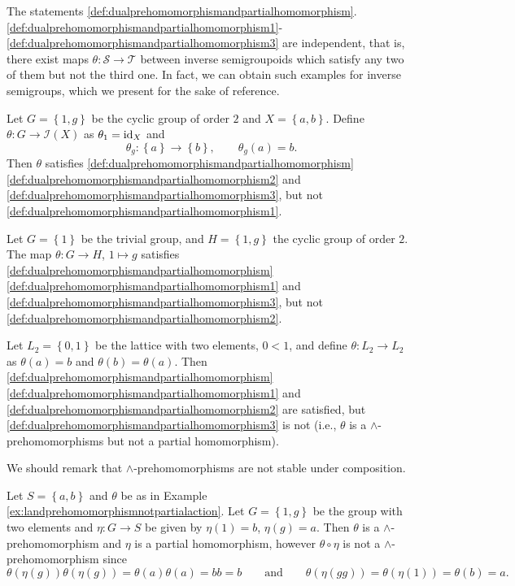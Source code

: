 The statements \ref{def:dualprehomomorphismandpartialhomomorphism}.\ref{def:dualprehomomorphismandpartialhomomorphism1}-\ref{def:dualprehomomorphismandpartialhomomorphism3} are independent, that is, there exist maps $\theta\colon\mathcal{S}\to\mathcal{T}$ between inverse semigroupoids which satisfy any two of them but not the third one. In fact, we can obtain such examples for inverse semigroups, which we present for the sake of reference.

\begin{example}
Let $G=\left\{1,g\right\}$ be the cyclic group of order $2$ and $X=\left\{a,b\right\}$. Define $\theta\colon G\to\mathcal{I}(X)$ as $\theta_1=\operatorname{id}_X$ and \[\theta_g\colon\left\{a\right\}\to\left\{b\right\},\qquad\theta_g(a)=b.\]
Then $\theta$ satisfies \ref{def:dualprehomomorphismandpartialhomomorphism}\ref{def:dualprehomomorphismandpartialhomomorphism2} and \ref{def:dualprehomomorphismandpartialhomomorphism3}, but not \ref{def:dualprehomomorphismandpartialhomomorphism1}.
\end{example}

\begin{example}
Let $G=\left\{1\right\}$ be the trivial group, and $H=\left\{1,g\right\}$ the cyclic group of order $2$. The map $\theta\colon G\to H$, $1\mapsto g$ satisfies  \ref{def:dualprehomomorphismandpartialhomomorphism}\ref{def:dualprehomomorphismandpartialhomomorphism1} and \ref{def:dualprehomomorphismandpartialhomomorphism3}, but not \ref{def:dualprehomomorphismandpartialhomomorphism2}.
\end{example}

\begin{example}\label{ex:landprehomomorphismnotpartialaction}
Let $L_2=\left\{0,1\right\}$ be the lattice with two elements, $0<1$, and define $\theta\colon L_2\to L_2$ as $\theta(a)=b$ and $\theta(b)=\theta(a)$. Then \ref{def:dualprehomomorphismandpartialhomomorphism}\ref{def:dualprehomomorphismandpartialhomomorphism1} and \ref{def:dualprehomomorphismandpartialhomomorphism2} are satisfied, but \ref{def:dualprehomomorphismandpartialhomomorphism3} is not (i.e., $\theta$ is a $\land$-prehomomorphisms but not a partial homomorphism).
\end{example}

We should remark that $\land$-prehomomorphisms are not stable under composition.

\begin{example}
Let $S=\left\{a,b\right\}$ and $\theta$ be as in Example \ref{ex:landprehomomorphismnotpartialaction}. Let $G=\left\{1,g\right\}$ be the group with two elements and $\eta\colon G\to S$ be given by $\eta(1)=b$, $\eta(g)=a$. Then $\theta$ is a $\land$-prehomomorphism and $\eta$ is a partial homomorphism, however $\theta\circ\eta$ is not a $\land$-prehomomorphism since
\[\theta(\eta(g))\theta(\eta(g))=\theta(a)\theta(a)=bb=b\qquad\text{and}\qquad\theta(\eta(gg))=\theta(\eta(1))=\theta(b)=a.\]
\end{example}

